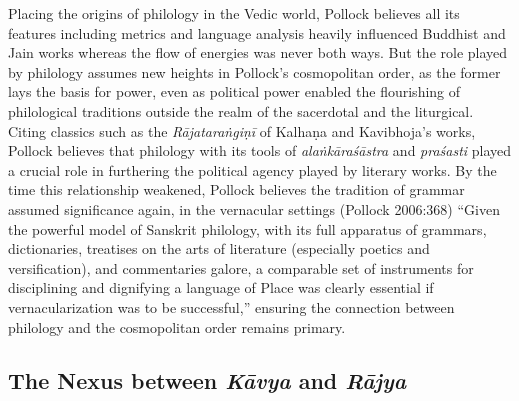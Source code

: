 Placing the origins of philology in the Vedic world, Pollock believes all its features including metrics and language analysis heavily influenced Buddhist and Jain works whereas the flow of energies was never both ways. But the role played by philology assumes new heights in Pollock’s cosmopolitan order, as the former lays the basis for power, even as political power enabled the flourishing of philological traditions outside the realm of the sacerdotal and the liturgical. Citing classics such as the \textit{Rājataraṅgiṇī} of Kalhaṇa and Kavibhoja’s works, Pollock believes that philology with its tools of \textit{alaṅkāraśāstra} and \textit{praśasti} played a crucial role in furthering the political agency played by literary works. By the time this relationship weakened, Pollock believes the tradition of grammar assumed significance again, in the vernacular settings (Pollock 2006:368) “Given the powerful model of Sanskrit philology, with its full apparatus of grammars, dictionaries, treatises on the arts of literature (especially poetics and versification), and commentaries galore, a comparable set of instruments for disciplining and dignifying a language of Place was clearly essential if vernacularization was to be successful,” ensuring the connection between philology and the cosmopolitan order remains primary.


\subsection{The Nexus between \textit{Kāvya} and \textit{Rājya}}


